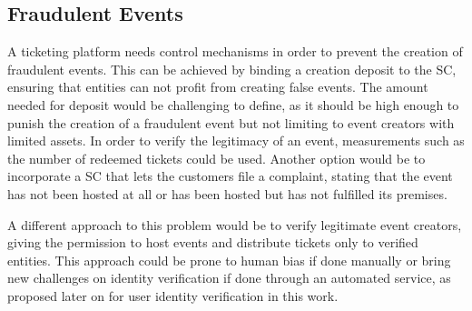 \subsection{Fraudulent Events}\label{subsection:fraudulent-events}
A ticketing platform needs control mechanisms in order to prevent the creation of fraudulent events. This can be achieved by binding a creation deposit to the SC, ensuring that entities can not profit from creating false events. The amount needed for deposit would be challenging to define, as it should be high enough to punish the creation of a fraudulent event but not limiting to event creators with limited assets. In order to verify the legitimacy of an event, measurements such as the number of redeemed tickets could be used. Another option would be to incorporate a SC that lets the customers file a complaint, stating that the event has not been hosted at all or has been hosted but has not fulfilled its premises. 

A different approach to this problem would be to verify legitimate event creators, giving the permission to host events and distribute tickets only to verified entities. This approach could be prone to human bias if done manually or bring new challenges on identity verification if done through an automated service, as proposed later on for user identity verification in this work.

